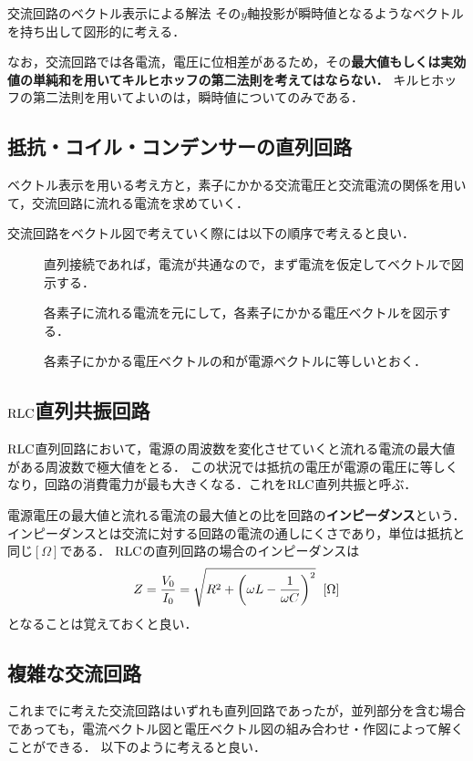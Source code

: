 \begin{matome}{交流回路のベクトル表示による解法}
 \hspace{3mm} その$y$軸投影が瞬時値となるようなベクトルを持ち出して図形的に考える．
 \end{matome}
 
 なお，交流回路では各電流，電圧に位相差があるため，その{\bf 最大値もしくは実効値の単純和を用いてキルヒホッフの第二法則を考えてはならない．}
 キルヒホッフの第二法則を用いてよいのは，瞬時値についてのみである．

\subsection{抵抗・コイル・コンデンサーの直列回路}
ベクトル表示を用いる考え方と，素子にかかる交流電圧と交流電流の関係を用いて，交流回路に流れる電流を求めていく．

交流回路をベクトル図で考えていく際には以下の順序で考えると良い．
\begin{description}
\item[] 直列接続であれば，電流が共通なので，まず電流を仮定してベクトルで図示する．
\item[] 各素子に流れる電流を元にして，各素子にかかる電圧ベクトルを図示する．
\item[] 各素子にかかる電圧ベクトルの和が電源ベクトルに等しいとおく．
\end{description}

\subsection{${\rm RLC}$直列共振回路}
${\rm RLC}$直列回路において，電源の周波数を変化させていくと流れる電流の最大値がある周波数で極大値をとる．
この状況では抵抗の電圧が電源の電圧に等しくなり，回路の消費電力が最も大きくなる．これを${\rm RLC}$直列共振と呼ぶ．

電源電圧の最大値と流れる電流の最大値との比を回路の{\bf インピーダンス}という．
インピーダンスとは交流に対する回路の電流の通しにくさであり，単位は抵抗と同じ$[\Omega]$である．
${\rm RLC}$の直列回路の場合のインピーダンスは
\[Z=\dfrac{V_0}{I_0}=\sqrt{R^2+\left( \omega L-\dfrac{1}{\omega C} \right)^2} \hspace{2mm} [\Omega] \]
となることは覚えておくと良い．

\subsection{複雑な交流回路}
これまでに考えた交流回路はいずれも直列回路であったが，並列部分を含む場合であっても，電流ベクトル図と電圧ベクトル図の組み合わせ・作図によって解くことができる．
以下のように考えると良い．

